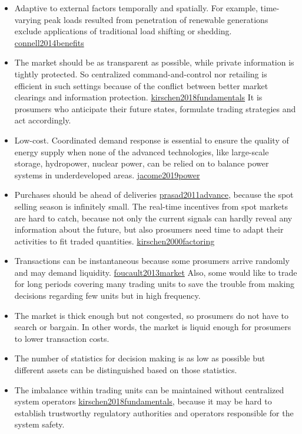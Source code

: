 \documentclass[letterpaper,8pt,twocolumn,twoside,]{pinp}
\providecommand{\tightlist}{%
  \setlength{\itemsep}{0pt}\setlength{\parskip}{0pt}}
\begin{document}
\begin{itemize}
\tightlist
\item
  Adaptive to external factors temporally and spatially. For example,
  time-varying peak loads resulted from penetration of renewable
  generations exclude applications of traditional load shifting or
  shedding. \protect\hyperlink{reference}{connell2014benefits}
\item
  The market should be as transparent as possible, while private
  information is tightly protected. So centralized command-and-control
  nor retailing is efficient in such settings because of the conflict
  between better market clearings and information protection.
  \protect\hyperlink{reference}{kirschen2018fundamentals} It is
  prosumers who anticipate their future states, formulate trading
  strategies and act accordingly.
\item
  Low-cost. Coordinated demand response is essential to ensure the
  quality of energy supply when none of the advanced technologies, like
  large-scale storage, hydropower, nuclear power, can be relied on to
  balance power systems in underdeveloped areas.
  \protect\hyperlink{reference}{jacome2019power}
\item
  Purchases should be ahead of deliveries
  \protect\hyperlink{reference}{prasad2011advance}, because the spot
  selling season is infinitely small. The real-time incentives from spot
  markets are hard to catch, because not only the current signals can
  hardly reveal any information about the future, but also prosumers
  need time to adapt their activities to fit traded quantities.
  \protect\hyperlink{reference}{kirschen2000factoring}
\item
  Transactions can be instantaneous because some prosumers arrive
  randomly and may demand liquidity.
  \protect\hyperlink{reference}{foucault2013market} Also, some would
  like to trade for long periods covering many trading units to save the
  trouble from making decisions regarding few units but in high
  frequency.
\item
  The market is thick enough but not congested, so prosumers do not have
  to search or bargain. In other words, the market is liquid enough for
  prosumers to lower transaction costs.
\item
  The number of statistics for decision making is as low as possible but
  different assets can be distinguished based on those statistics.
\item
  The imbalance within trading units can be maintained without
  centralized system operators
  \protect\hyperlink{reference}{kirschen2018fundamentals}, because it
  may be hard to establish trustworthy regulatory authorities and
  operators responsible for the system safety.
\end{itemize}
\end{document}
